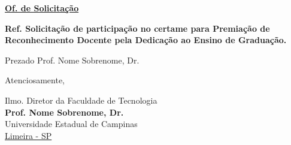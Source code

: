 \documentclass[12pt,a4paper]{oficioft}
\date{\today}
\begin{document}
 \begin{letter}{
     \underline{\textbf{Of. de Solicitação}}%
     
     \textbf{Ref. Solicitação de participação no certame para Premiação de Reconhecimento Docente pela Dedicação ao Ensino de Graduação.} 
}

 \opening{Prezado Prof. Nome Sobrenome, Dr.}

\lipsum[1-2]

\closing{Atenciosamente,}

\vfill

Ilmo. Diretor da Faculdade de Tecnologia \\
\textbf{Prof. Nome Sobrenome, Dr.} \\
Universidade Estadual de Campinas \\
\underline{Limeira - SP}
\end{letter}
\end{document}
